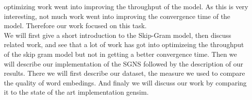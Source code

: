 optimizing work went into improving the throughput of the model. As this is very interesting, not much work went into improving the convergence time of the model. Therefore our work focused on this task.  \\
We will first give a short introduction to the Skip-Gram model, then discuss related work, and see that a lot of work has got into optimizeing the throughput of the skip gram model but not in getting a better convergence time. Then we will describe our implementation of the SGNS followed by the description of our results. There we will first describe our dataset, the measure we used to compare the quality of word embedings. And finaly we will discuss our work by comparing it to the state of the art implementation gensim. 

  














